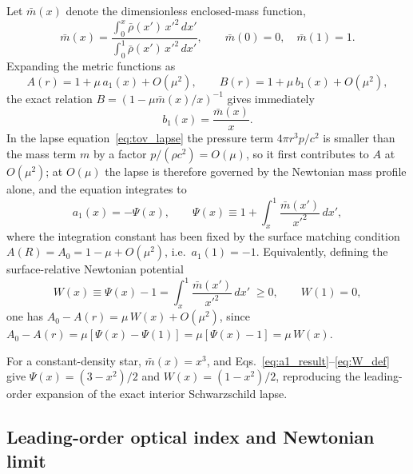 \documentclass[
  aps,
  prd,
  twocolumn,
  nofootinbib,
  superscriptaddress,
  longbibliography
]{revtex4-2}
\begin{document}
Let $\bar m(x)$ denote the dimensionless enclosed-mass function,
\begin{equation}
\bar m(x)
=
\frac{\displaystyle\int_0^x \bar\rho(x')\,x'^2\,dx'}
     {\displaystyle\int_0^1 \bar\rho(x')\,x'^2\,dx'},
\qquad
\bar m(0)=0,\quad \bar m(1)=1.
\label{eq:mbar_def}
\end{equation}
Expanding the metric functions as
\begin{equation}
A(r)=1+\mu\,a_1(x)+O(\mu^2),
\qquad
B(r)=1+\mu\,b_1(x)+O(\mu^2),
\label{eq:AB_expansion}
\end{equation}
the exact relation $B=(1-\mu\bar m(x)/x)^{-1}$ gives immediately
\begin{equation}
b_1(x)=\frac{\bar m(x)}{x}.
\label{eq:b1_result}
\end{equation}
In the lapse equation~\eqref{eq:tov_lapse} the pressure term
$4\pi r^3 p/c^2$ is smaller than the mass term $m$ by a factor
$p/(\rho c^2)=O(\mu)$, so it first contributes to $A$ at $O(\mu^2)$; at
$O(\mu)$ the lapse is therefore governed by the Newtonian mass profile
alone, and the equation integrates to
\begin{equation}
a_1(x)=-\Psi(x),
\qquad
\Psi(x)\equiv 1+\int_x^1\frac{\bar m(x')}{x'^2}\,dx',
\label{eq:a1_result}
\end{equation}
where the integration constant has been fixed by the surface matching
condition $A(R)=A_0=1-\mu+O(\mu^2)$, i.e.\ $a_1(1)=-1$. Equivalently,
defining the surface-relative Newtonian potential
\begin{equation}
W(x)\equiv \Psi(x)-1=\int_x^1\frac{\bar m(x')}{x'^2}\,dx'\;\geq 0,
\qquad W(1)=0,
\label{eq:W_def}
\end{equation}
one has $A_0-A(r)=\mu\,W(x)+O(\mu^2)$, since $A_0-A(r)=\mu[\Psi(x)-\Psi(1)]
=\mu[\Psi(x)-1]=\mu\,W(x)$.

For a constant-density star, $\bar m(x)=x^3$, and
Eqs.~\eqref{eq:a1_result}--\eqref{eq:W_def} give
$\Psi(x)=(3-x^2)/2$ and $W(x)=(1-x^2)/2$, reproducing the leading-order
expansion of the exact interior Schwarzschild lapse.

\subsection{Leading-order optical index and Newtonian limit}
\end{document}
